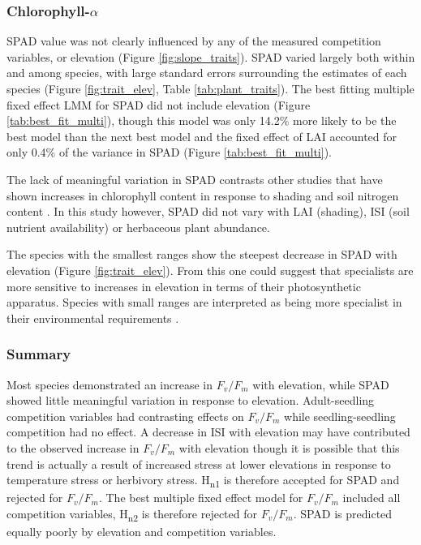 \documentclass[a4paper, 11pt]{article}
\begin{document}
\subsubsection*{Chlorophyll-$\alpha$}

SPAD value was not clearly influenced by any of the measured competition variables, or elevation (Figure \ref{fig:slope_traits}). SPAD varied largely both within and among species, with large standard errors surrounding the estimates of each species (Figure \ref{fig:trait_elev}, Table \ref{tab:plant_traits}). The best fitting multiple fixed effect LMM for SPAD did not include elevation (Figure \ref{tab:best_fit_multi}), though this model was only 14.2\% more likely to be the best model than the next best model and the fixed effect of LAI accounted for only 0.4\% of the variance in SPAD (Figure \ref{tab:best_fit_multi}). 

The lack of meaningful variation in SPAD contrasts other studies that have shown increases in chlorophyll content in response to shading \citep{Brand1997, Rijkers2000, Rozendaal2006, Dai2009, Zervoudakis2012} and soil nitrogen content \citep{Cechin2004}. In this study however, SPAD did not vary with LAI (shading), ISI (soil nutrient availability) or herbaceous plant abundance. 

The species with the smallest ranges show the steepest decrease in SPAD with elevation (Figure \ref{fig:trait_elev}). From this one could suggest that specialists are more sensitive to increases in elevation in terms of their photosynthetic apparatus. Species with small ranges are interpreted as being more specialist in their environmental requirements \citep{Thuiller2005}.

\subsubsection*{Summary}
Most species demonstrated an increase in $F_v/F_m$ with elevation, while SPAD showed little meaningful variation in response to elevation. Adult-seedling competition variables had contrasting effects on $F_v/F_m$ while seedling-seedling competition had no effect. A decrease in ISI with elevation may have contributed to the observed increase in $F_v/F_m$ with elevation though it is possible that this trend is actually a result of increased stress at lower elevations in response to temperature stress or herbivory stress. H\textsubscript{n1} is therefore accepted for SPAD and rejected for $F_v/F_m$. The best multiple fixed effect model for $F_v/F_m$ included all competition variables, H\textsubscript{n2} is therefore rejected for $F_v/F_m$. SPAD is predicted equally poorly by elevation and competition variables.
\end{document}
